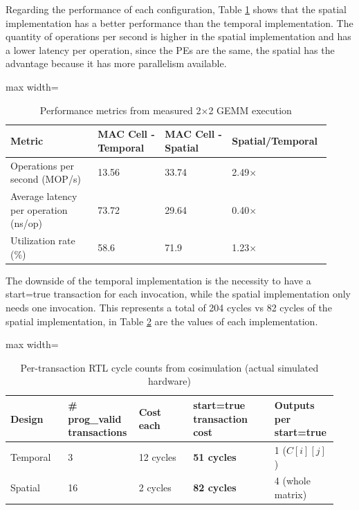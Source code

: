 \documentclass[conference]{IEEEtran}
\begin{document}
Regarding the performance of each configuration, Table \ref{tab:perf_metrics_gemm} shows that the spatial implementation has a better performance than the temporal implementation.
The quantity of operations per second is higher in the spatial implementation and has a lower latency per operation, since the PEs are the same, the spatial has the advantage because it has more parallelism available.

\begin{table}[htbp]
\centering
\caption{Performance metrics from measured 2$\times$2 GEMM execution}
\label{tab:perf_metrics_gemm}
\scriptsize
\begin{adjustbox}{max width=\columnwidth}
\begin{tabular}{@{}p{0.26\linewidth}p{0.20\linewidth}p{0.20\linewidth}p{0.26\linewidth}@{}}
\toprule
\textbf{Metric} & \textbf{MAC Cell - Temporal} & \textbf{MAC Cell - Spatial} & \textbf{Spatial/Temporal} \\
\midrule
Operations per second (MOP/s) & 13.56  & 33.74  & 2.49$\times$ \\
Average latency per operation (ns/op) & 73.72  & 29.64 & 0.40$\times$ \\
Utilization rate (\%) & 58.6 & 71.9 & 1.23$\times$ \\
\bottomrule
\end{tabular}
\end{adjustbox}
\end{table}


The downside of the temporal implementation is the necessity to have a start=true transaction for each invocation, while the spatial implementation only needs one invocation. 
This represents a total of 204 cycles vs 82 cycles of the spatial implementation, in Table \ref{tab:rtl_transaction_cycles_gemm} are the values of each implementation.

\begin{table}[htbp]
\centering
\caption{Per-transaction RTL cycle counts from cosimulation (actual simulated hardware)}
\label{tab:rtl_transaction_cycles_gemm}
\scriptsize
\begin{adjustbox}{max width=\columnwidth}
\begin{tabular}{@{}p{0.17\linewidth}p{0.20\linewidth}p{0.16\linewidth}p{0.24\linewidth}p{0.17\linewidth}@{}}
\toprule
\textbf{Design} & \textbf{\# prog\_valid transactions} & \textbf{Cost each} & \textbf{start=true transaction cost} & \textbf{Outputs per start=true} \\
\midrule
Temporal & 3 & 12 cycles & \textbf{51 cycles} & 1 ($C[i][j]$) \\
Spatial & 16 & 2 cycles & \textbf{82 cycles} & 4 (whole matrix) \\
\bottomrule
\end{tabular}
\end{adjustbox}
\end{table}
\end{document}

